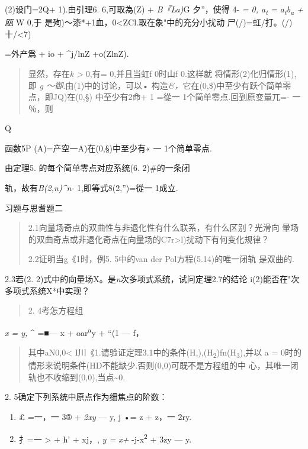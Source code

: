 \documentclass{article}
\begin{document}
(2)设门=2Q+ 1).由引理6. 6,可取為(Z) + \emph{B『La)}G 夕''，使得 4-
\emph{= 0, a\textsubscript{t} = a\textsubscript{t}b\textsubscript{a} +
瓯} W 0,于 是殉)〜漆*+1血，0\textless{}ZCl.取在象"中的充分小扰动
尸(/)=虹/打。(/)十/\textless{}7)

=外产爲 + io + \^{}j/lnZ +o(ZlnZ).

\begin{quote}
显然，存在\emph{k \textgreater{}} 0,有= 0,并且当虹f 0时山f 0.这样就
将情形(2)化归情形(1),即 \emph{g 〜御.}由(1)中的讨论，可以•
构造\emph{\&，}它在(0,\$)中至少有跃个简单零点，即JQ)在(0,§) 中至少有2命+
1 =從一 1个简单零点.回到原变量兀=- 一 ％，则
\end{quote}

Q

函数5P (A)=产空一A)在(0,§)中至少有« 一 1个简单零点.

由定理5. 的每个简单零点对应系统(6. 2)\#的一条闭

轨，故有\emph{B(2,n)\^{}n-} 1,即等式8(2,'')=從一 1成立.

\protect\hypertarget{bookmark118}{}{}习题与思耆题二

\begin{quote}
2.1向量场奇点的双曲性与非退化性有什么联系，有什么区别？光滑向
暈场的双曲奇点或非退化奇点在向量场的C7r\textgreater{}l)扰动下有何变化规律？

2.2证明当g\textbar{}《1时，例5. 5中的van der Pol方程(5.14)的唯一闭轨
是双曲的.
\end{quote}

2.3若(2. 2)式中的向量场X。是\emph{n}次多项式系统，试问定理2.7的结论
i(2)能否在"次多项式系统X*中实现？

\begin{quote}
2. 4考怎方程组
\end{quote}

\emph{x = y,} \^{} =■--- x + oar\textsuperscript{a}y + ``(1 --- f，

\begin{quote}
其中aN0,0\textless{}
I川《1.请验证定理3.1中的条件(H,),(H\textsubscript{2})fn(H\textsubscript{3}),并以
a = 0时的情形来说明条件(HD不能缺少.否则(0,0)可既不是方程组的中
心，其唯一闭轨也不收缩到(0,0),当点\textasciitilde{}0.
\end{quote}

2. 5确定下列系统中原点作为细焦点的阶数：

\begin{enumerate}
\def\labelenumi{(\arabic{enumi})}
\item
  £ =一，一 3® + \emph{2xy} --- y, j •= z + z，一 2ry.
\item
  扌=一 \textgreater{} + h' + xj，, \emph{y = x+}
  -j-x\textsuperscript{2} + 3zy --- y.
\end{enumerate}
\end{document}
